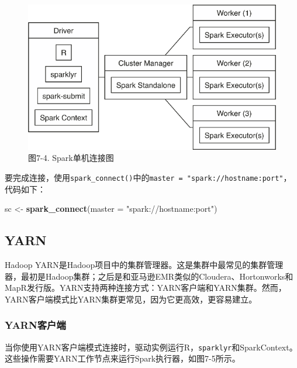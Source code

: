 \documentclass[
]{article}
\newenvironment{Shaded}{\begin{snugshade}}{\end{snugshade}}
\newcommand{\DataTypeTok}[1]{\textcolor[rgb]{0.13,0.29,0.53}{#1}}
\newcommand{\KeywordTok}[1]{\textcolor[rgb]{0.13,0.29,0.53}{\textbf{#1}}}
\newcommand{\NormalTok}[1]{#1}
\newcommand{\StringTok}[1]{\textcolor[rgb]{0.31,0.60,0.02}{#1}}
\begin{document}
\begin{figure}
\centering
\includegraphics{figures/7_4.png}
\caption{图7-4. Spark单机连接图}
\end{figure}

要完成连接，使用\texttt{spark\_connect()}中的\texttt{master\ =\ "spark://hostname:port"}，代码如下：

\begin{Shaded}
\begin{Highlighting}[]
\NormalTok{sc <-}\StringTok{ }\KeywordTok{spark_connect}\NormalTok{(}\DataTypeTok{master =} \StringTok{"spark://hostname:port"}\NormalTok{)}
\end{Highlighting}
\end{Shaded}

\hypertarget{yarn-1}{%
\subsection{YARN}\label{yarn-1}}

Hadoop
YARN是Hadoop项目中的集群管理器。这是集群中最常见的集群管理器，最初是Hadoop集群；之后是和亚马逊EMR类似的Cloudera、Hortonworks和MapR发行版。YARN支持两种连接方式：YARN客户端和YARN集群。然而，YARN客户端模式比YARN集群更常见，因为它更高效，更容易建立。

\hypertarget{yarnux5ba2ux6237ux7aef}{%
\subsubsection{YARN客户端}\label{yarnux5ba2ux6237ux7aef}}

当你使用YARN客户端模式连接时，驱动实例运行R，\texttt{sparklyr}和SparkContext。这些操作需要YARN工作节点来运行Spark执行器，如图7-5所示。
\end{document}
